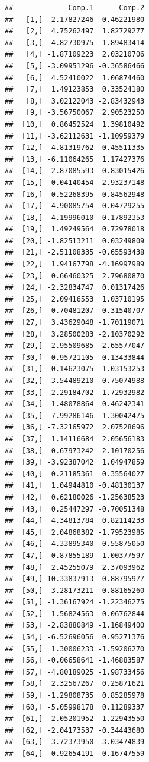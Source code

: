 \documentclass[
]{article}
\newenvironment{Shaded}{\begin{snugshade}}{\end{snugshade}}
\newcommand{\NormalTok}[1]{#1}
\newcommand{\SpecialCharTok}[1]{\textcolor[rgb]{0.00,0.00,0.00}{#1}}
\begin{document}
\begin{Shaded}
\end{Shaded}

\begin{verbatim}
##             Comp.1      Comp.2
##   [1,] -2.17827246 -0.46221980
##   [2,]  4.75262497  1.82729277
##   [3,]  4.82730975 -1.89483414
##   [4,] -1.87109223  2.03210706
##   [5,] -3.09951296 -0.36586466
##   [6,]  4.52410022  1.06874460
##   [7,]  1.49123853  0.33524180
##   [8,]  3.02122043 -2.83432943
##   [9,] -3.56750067  2.90523250
##  [10,]  0.86452524  1.39810492
##  [11,] -3.62112631 -1.10959379
##  [12,] -4.81319762 -0.45511335
##  [13,] -6.11064265  1.17427376
##  [14,]  2.87085593  0.83015426
##  [15,] -0.04140454 -2.93237148
##  [16,]  0.52268395  0.84562948
##  [17,]  4.90085754  0.04729255
##  [18,]  4.19996010  0.17892353
##  [19,]  1.49249564  0.72978018
##  [20,] -1.82513211  0.03249809
##  [21,] -2.51108335 -0.65593438
##  [22,]  1.94167798 -4.16997989
##  [23,]  0.66460325  2.79680870
##  [24,] -2.32834747  0.01317426
##  [25,]  2.09416553  1.03710195
##  [26,]  0.70481207  0.31540707
##  [27,]  3.43629048 -1.70119071
##  [28,]  3.28500283 -2.10370292
##  [29,] -2.95509685 -2.65577047
##  [30,]  0.95721105 -0.13433844
##  [31,] -0.14623075  1.03153253
##  [32,] -3.54489210  0.75074988
##  [33,] -2.29184702 -1.72932982
##  [34,]  1.48078864  0.46242341
##  [35,]  7.99286146 -1.30042475
##  [36,] -7.32165972  2.07528696
##  [37,]  1.14116684  2.05656183
##  [38,]  0.67973242 -2.10170256
##  [39,] -3.92387042  1.04947859
##  [40,]  0.21185361  0.35564027
##  [41,]  1.04944810 -0.48130137
##  [42,]  0.62180026 -1.25638523
##  [43,]  0.25447297 -0.70051348
##  [44,]  4.34813784  0.82114233
##  [45,]  2.04868382 -1.79523985
##  [46,]  4.33895340  0.55875050
##  [47,] -0.87855189  1.00377597
##  [48,]  2.45255079  2.37093962
##  [49,] 10.33837913  0.88795977
##  [50,] -3.28173211  0.88165260
##  [51,] -1.36167924 -1.22346275
##  [52,] -1.56824563  0.06762844
##  [53,] -2.83880849 -1.16849400
##  [54,] -6.52696056  0.95271376
##  [55,]  1.30006233 -1.59206270
##  [56,] -0.06658641 -1.46883587
##  [57,] -4.80189025 -1.98733456
##  [58,]  2.32567267  0.25871621
##  [59,] -1.29808735  0.85285978
##  [60,] -5.05998178  0.11289337
##  [61,] -2.05201952  1.22943550
##  [62,] -2.04173537 -0.34443680
##  [63,]  3.72373950  3.03474839
##  [64,]  0.92654191  0.16747559

\end{verbatim}
\end{document}
